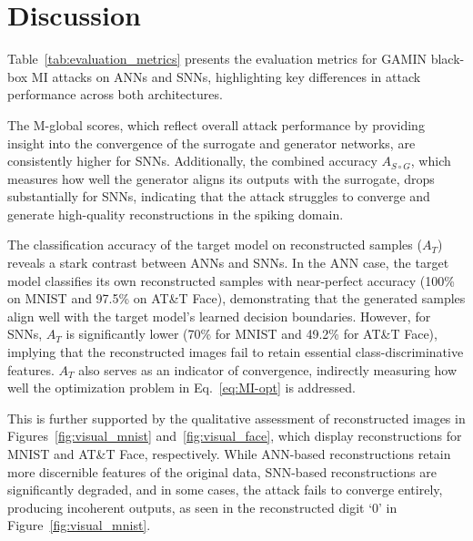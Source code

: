 \section{Discussion}
\label{sec:discussion}



\noindent
Table~\ref{tab:evaluation_metrics} presents the evaluation metrics for GAMIN black-box MI attacks on ANNs and SNNs, highlighting key differences in attack performance across both architectures.

The M-global scores, which reflect overall attack performance by providing insight into the convergence of the surrogate and generator networks, are consistently higher for SNNs. Additionally, the combined accuracy \( A_{S \circ G} \), which measures how well the generator aligns its outputs with the surrogate, drops substantially for SNNs, indicating that the attack struggles to converge and generate high-quality reconstructions in the spiking domain.





The classification accuracy of the target model on reconstructed samples (\( A_T \)) reveals a stark contrast between ANNs and SNNs. In the ANN case, the target model classifies its own reconstructed samples with near-perfect accuracy (100\% on MNIST and 97.5\% on AT\&T Face), demonstrating that the generated samples align well with the target model’s learned decision boundaries. However, for SNNs, \( A_T \) is significantly lower (70\% for MNIST and 49.2\% for AT\&T Face), implying that the reconstructed images fail to retain essential class-discriminative features.
\( A_T \) also serves as an indicator of convergence, indirectly measuring how well the optimization problem in Eq.~\ref{eq:MI-opt} is addressed.



This is further supported by the qualitative assessment of reconstructed images in Figures~\ref{fig:visual_mnist} and~\ref{fig:visual_face}, which display reconstructions for MNIST and AT\&T Face, respectively. While ANN-based reconstructions retain more discernible features of the original data, SNN-based reconstructions are significantly degraded, and in some cases, the attack fails to converge entirely, producing incoherent outputs, as seen in the reconstructed digit ‘0’ in Figure~\ref{fig:visual_mnist}.









